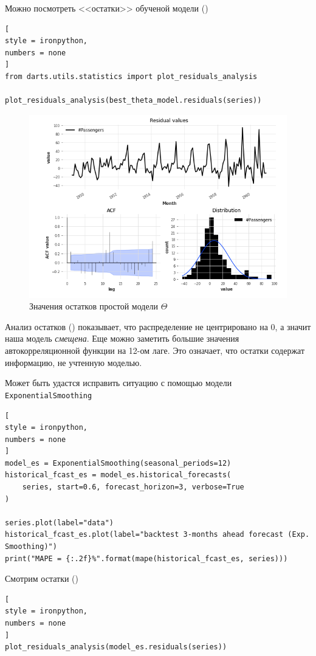 \documentclass[%
	11pt,
	a4paper,
	utf8,
		]{article}
\begin{document}
Можно посмотреть <<остатки>> обученой модели ()
\begin{lstlisting}[
style = ironpython,
numbers = none
]
from darts.utils.statistics import plot_residuals_analysis

plot_residuals_analysis(best_theta_model.residuals(series))
\end{lstlisting}

\begin{figure}[h]
	\centering
	\includegraphics[scale=1.25]{figures/residuals_darts.png}
	\caption{ Значения остатков простой модели $ \Theta $}\label{fig:residuals_darts}
\end{figure}

Анализ остатков () показывает, что распределение не центрировано на 0, а значит наша модель \emph{смещена}. Еще можно заметить большие значения автокорреляционной функции на 12-ом лаге. Это означает, что остатки содержат информацию, не учтенную моделью.

Может быть удастся исправить ситуацию с помощью модели \verb|ExponentialSmoothing|
\begin{lstlisting}[
style = ironpython,
numbers = none
]
model_es = ExponentialSmoothing(seasonal_periods=12)
historical_fcast_es = model_es.historical_forecasts(
	series, start=0.6, forecast_horizon=3, verbose=True
)

series.plot(label="data")
historical_fcast_es.plot(label="backtest 3-months ahead forecast (Exp. Smoothing)")
print("MAPE = {:.2f}%".format(mape(historical_fcast_es, series)))
\end{lstlisting}

Смотрим остатки ()
\begin{lstlisting}[
style = ironpython,
numbers = none
]
plot_residuals_analysis(model_es.residuals(series))
\end{lstlisting}
\end{document}
